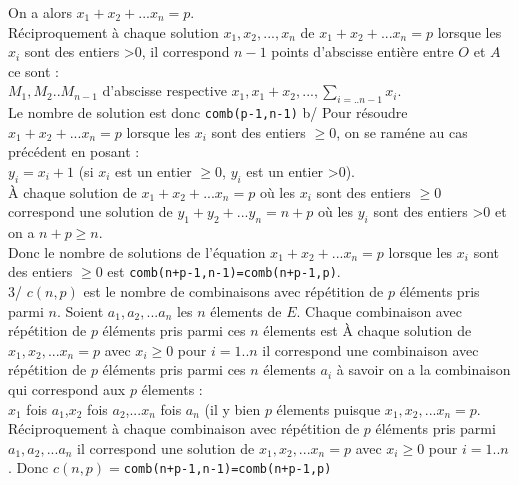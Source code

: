 \documentclass[a4paper,11pt]{book}
\begin{document}
On a alors $x_1+x_2+...x_n=p$.\\
R\'eciproquement \`a chaque solution $x_1,x_2,...,x_n$  de $x_1+x_2+...x_n=p$ 
lorsque les $x_i$ sont des entiers >0, il
correspond $n-1$ points d'abscisse enti\`ere entre $O$ et $A$ ce sont :\\
$M_1,M_2..M_{n-1}$ d'abscisse respective $x_1,x_1+x_2,...,\sum_{i=..n-1}x_i$.\\
Le nombre de solution est donc {\tt comb(p-1,n-1)}
b/ Pour r\'esoudre $x_1+x_2+...x_n=p$ lorsque les $x_i$ sont des entiers 
$\geq 0$, on se ram\'ene au cas pr\'ec\'edent en posant :\\
$y_i=x_i+1$ (si $x_i$ est un entier $\geq 0$, $y_i$ est un entier >0).\\
\`A chaque solution de $x_1+x_2+...x_n=p$ o\`u les $x_i$ sont des entiers 
$\geq 0$  correspond une solution de $y_1+y_2+...y_n=n+p$ o\`u les $y_i$ sont 
des entiers >0 et on a  $n+p\geq n$.\\
Donc le nombre de solutions de l'\'equation $x_1+x_2+...x_n=p$ lorsque les $x_i$
sont des entiers $\geq 0$ est {\tt comb(n+p-1,n-1)=comb(n+p-1,p)}.\\
3/ $c(n,p)$ est le nombre de combinaisons avec r\'ep\'etition de $p$ 
\'el\'ements pris parmi $n$.
Soient $a_1,a_2,...a_n$ les $n$ \'elements de $E$. Chaque combinaison avec 
r\'ep\'etition de $p$ \'el\'ements pris parmi ces $n$ \'elements est 
\`A chaque solution de $x_1,x_2,...x_n=p$ avec $x_i \geq 0$ pour $i=1..n$ 
il correspond une combinaison avec r\'ep\'etition de $p$ \'el\'ements pris 
parmi ces $n$ \'elements $a_i$ \`a savoir on a la combinaison qui correspond aux
 $p$ \'elements :\\
$x_1$ fois $a_1$,$x_2$ fois $a_2$,...$x_n$ fois $a_n$ (il y bien $p$ \'elements
puisque $x_1,x_2,...x_n=p$. 
R\'eciproquement \`a chaque combinaison avec 
r\'ep\'etition de $p$ \'el\'ements pris parmi $a_1,a_2,...a_n$ il correspond
une solution de $x_1,x_2,...x_n=p$ avec $x_i \geq 0$ pour $i=1..n$.
Donc $c(n,p)=${\tt comb(n+p-1,n-1)=comb(n+p-1,p)} 
\end{document}
